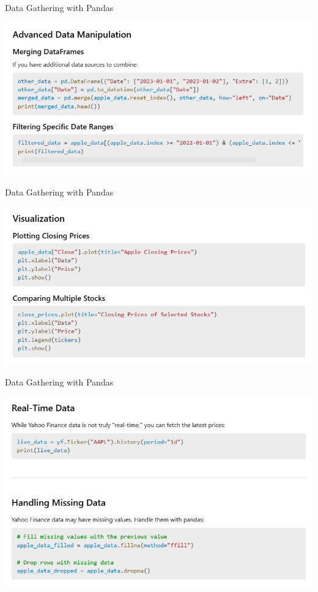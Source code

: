 \documentclass[11pt]{beamer}
\begin{document}
\begin{frame}{Data Gathering with Pandas}
	\begin{center}
	\includegraphics[scale=0.55]{../05-pictures/lesson-1-3_pic_17.png}
	\end{center}
\end{frame}
\begin{frame}{Data Gathering with Pandas}
	\begin{center}
	\includegraphics[scale=0.55]{../05-pictures/lesson-1-3_pic_18.png}
	\end{center}
\end{frame}
\begin{frame}{Data Gathering with Pandas}
	\begin{center}
	\includegraphics[scale=0.55]{../05-pictures/lesson-1-3_pic_19.png}
	\end{center}
\end{frame}
\end{document}
